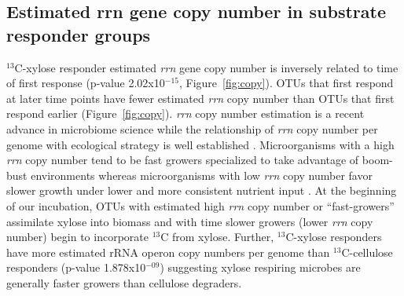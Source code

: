\subsection{Estimated rrn gene copy number in substrate responder groups}
$^{13}$C-xylose responder estimated \textit{rrn} gene copy number is inversely
related to time of first response (p-value 2.02x10$^{-15}$,
Figure~\ref{fig:copy}). OTUs that first respond at later time points have fewer
estimated \textit{rrn} copy number than OTUs that first respond earlier
(Figure~\ref{fig:copy}). \textit{rrn} copy number estimation is a recent
advance in microbiome science \citep{Kembel_2012} while the relationship of
\textit{rrn} copy number per genome with ecological strategy is well
established \citep{Klappenbach_2000}.  Microorganisms with a high \textit{rrn} 
copy number tend to be fast growers specialized to take advantage of boom-bust
environments whereas microorganisms with low \textit{rrn} copy number favor
slower growth under lower and more consistent nutrient input
\citep{Klappenbach_2000}. At the beginning of our incubation, OTUs with
estimated high \textit{rrn} copy number or ``fast-growers''
assimilate xylose into biomass and with time slower growers (lower \textit{rrn} 
copy number) begin to incorporate $^{13}$C from xylose.  Further,
$^{13}$C-xylose responders have more estimated rRNA operon copy numbers per
genome than $^{13}$C-cellulose responders (p-value 1.878x10$^{-09}$) suggesting
xylose respiring microbes are generally faster growers than cellulose
degraders.




